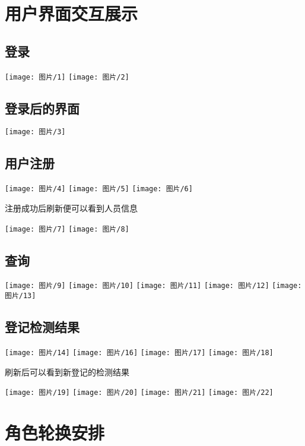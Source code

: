 \documentclass{article}
\begin{document}
\section{用户界面交互展示}
\subsection{登录}
\begin{center}
\texttt{[image: 图片/1]}
\texttt{[image: 图片/2]}
\end{center}
\subsection{登录后的界面}
\begin{center}
\texttt{[image: 图片/3]}
\end{center}
\subsection{用户注册}
\begin{center}
\texttt{[image: 图片/4]}
\texttt{[image: 图片/5]}
\texttt{[image: 图片/6]}
\end{center}
注册成功后刷新便可以看到人员信息
\begin{center}
\texttt{[image: 图片/7]}
\texttt{[image: 图片/8]}
\end{center}
\subsection{查询}
\begin{center}
\texttt{[image: 图片/9]}
\texttt{[image: 图片/10]}
\texttt{[image: 图片/11]}
\texttt{[image: 图片/12]}
\texttt{[image: 图片/13]}
\end{center}
\subsection{登记检测结果}
\begin{center}
\texttt{[image: 图片/14]}
\texttt{[image: 图片/16]}
\texttt{[image: 图片/17]}
\texttt{[image: 图片/18]}
\end{center}

刷新后可以看到新登记的检测结果

\begin{center}
\texttt{[image: 图片/19]}
\texttt{[image: 图片/20]}
\texttt{[image: 图片/21]}
\texttt{[image: 图片/22]}
\end{center}
\section{角色轮换安排}
\end{document}
